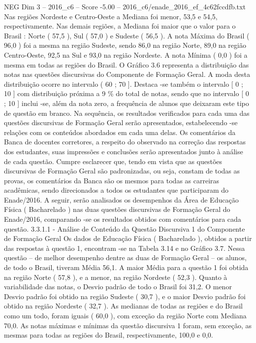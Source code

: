 \begin{textsample}{NEG Dim 3 – 2016\_c6 – Score -5.00 – 2016\_c6/enade\_2016\_ef\_4c62fccdfb.txt}
Nas regiões Nordeste e Centro-Oeste a Mediana foi menor, 53,5 e 54,5, respectivamente.
Nas demais regiões, a Mediana foi maior que o valor para o Brasil : Norte ( 57,5 ), Sul ( 57,0 ) e Sudeste ( 56,5 ).
A nota Máxima do Brasil ( 96,0 ) foi a mesma na região Sudeste, sendo 86,0 na região Norte, 89,0 na região Centro-Oeste, 92,5 na Sul e 93,0 na região Nordeste.
A nota Mínima ( 0,0 ) foi a mesma em todas as regiões do Brasil.
O Gráfico 3.6 representa a distribuição das notas nas questões discursivas do Componente de Formação Geral.
A moda desta distribuição ocorre no intervalo ( 60 ; 70 ].
Destaca -se também o intervalo [ 0 ; 10 ] com distribuição próxima a 9 \% do total de notas, sendo que no intervalo [ 0 ; 10 ] inclui -se, além da nota zero, a frequência de alunos que deixaram este tipo de questão em branco.
Na sequência, os resultados verificados para cada uma das questões discursivas de Formação Geral serão apresentados, estabelecendo -se relações com os conteúdos abordados em cada uma delas.
Os comentários da Banca de docentes corretores, a respeito do observado na correção das respostas dos estudantes, suas impressões e conclusões serão apresentados junto à análise de cada questão.
Cumpre esclarecer que, tendo em vista que as questões discursivas de Formação Geral são padronizadas, ou seja, constam de todas as provas, os comentários da Banca são os mesmos para todas as carreiras acadêmicas, sendo direcionados a todos os estudantes que participaram do Enade/2016.
A seguir, serão analisados os desempenhos da Área de Educação Física ( Bacharelado ) nas duas questões discursivas de Formação Geral do Enade/2016, comparando -se os resultados obtidos com comentários para cada questão. 3.3.1.1 - Análise de Conteúdo da Questão Discursiva 1 do Componente de Formação Geral Os dados de Educação Física ( Bacharelado ), obtidos a partir das respostas à questão 1, encontram -se na Tabela 3.14 e no Gráfico 3.7.
Nessa questão – de melhor desempenho dentre as duas de Formação Geral – os alunos, de todo o Brasil, tiveram Média 56,1.
A maior Média para a questão 1 foi obtida na região Norte ( 57,8 ), e a menor, na região Nordeste ( 52,3 ).
Quanto à variabilidade das notas, o Desvio padrão de todo o Brasil foi 31,2.
O menor Desvio padrão foi obtido na região Sudeste ( 30,7 ), e o maior Desvio padrão foi obtido na região Nordeste ( 32,7 ).
As medianas de todas as regiões e do Brasil como um todo, foram iguais ( 60,0 ), com exceção da região Norte com Mediana 70,0.
As notas máximas e mínimas da questão discursiva 1 foram, sem exceção, as mesmas para todas as regiões do Brasil, respectivamente, 100,0 e 0,0.

\end{textsample}
